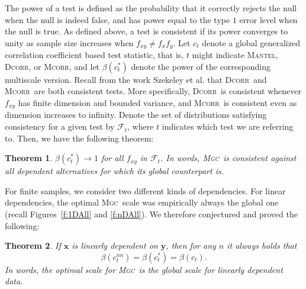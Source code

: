 \documentclass[11pt]{article}
\newcommand{\note}[2][]{\added[#1,remark={#2}]{}}
\providecommand{\sct}[1]{{\normalfont\textsc{#1}}}
\providecommand{\mb}[1]{\boldsymbol{#1}}
\providecommand{\mc}[1]{\mathcal{#1}}
\newcommand{\G}{c}
\newcommand{\Mgc}{\sct{Mgc}}
\newcommand{\Dcorr}{\sct{Dcorr}}
\newcommand{\Mcorr}{\sct{Mcorr}}
\newcommand{\Mantel}{\sct{Mantel}}
\newcommand{\cs}[1]{{\note{cs: #1}}}
\newtheorem{thm}{Theorem}
\begin{document}
The power of a test is defined as the probability that it correctly rejects the null when the null is indeed false, and has power equal to the type $1$ error level when the null is true.
\cs{i added the above clause and removed the similar one after the theorem.}
As defined above, a test is consistent if its power converges to unity as sample size increases when $f_{xy} \neq f_x f_y$.
Let $\G_t$ denote a global generalized correlation coefficient based test statistic, that is, $t$ might indicate \Mantel, \Dcorr, or \Mcorr, and let $\beta(\G_t^*)$ denote the power of the corresponding multiscale version.
Recall from the work Szekeley et al. that \Dcorr~and \Mcorr~are both consistent tests. More specifically, \Dcorr~is consistent whenever $f_{xy}$ has finite dimension and bounded variance, and \Mcorr~is consistent even as dimension increases to infinity.  Denote the set of distributions satisfying consistency for a given test by $\mc{F}_t$, where $t$ indicates which test we are referring to. Then, we have the following theorem:
\begin{thm}
\label{thm1}
$\beta(\G_t^*) \rightarrow 1$ for all $f_{xy}$ in $\mc{F}_t$.
In words, \Mgc~is consistent against all dependent alternatives for which its global counterpart is. 
\end{thm}

% 
For finite samples, we consider two different kinds of dependencies.
For linear dependencies,  the optimal \Mgc~scale was empirically always the global one (recall Figures~\ref{f:1DAll} and \ref{f:nDAll}). We therefore conjectured and proved the following:
\begin{thm}
\label{t:linear}
If $\mb{x}$ is linearly dependent on $\mb{y}$, then for any $n$ it always holds that
\begin{equation}
\beta(\G^{nn}_t) = \beta(\G^{*}_t) = \beta(\G_t).
\end{equation}
In words, the optimal scale for \Mgc~is the global scale for linearly dependent data.
\end{thm}
\end{document}
